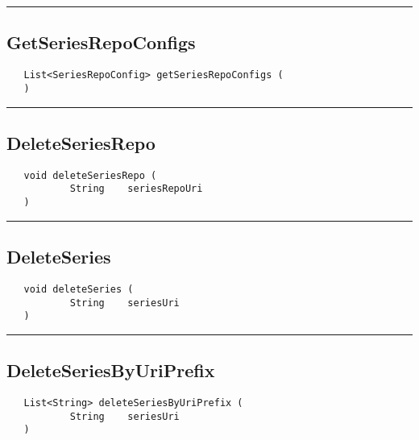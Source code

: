 \rule{15cm}{2pt}
\subsection{GetSeriesRepoConfigs}
\label{Api:GetSeriesRepoConfigs}
\begin{verbatim}
   List<SeriesRepoConfig> getSeriesRepoConfigs (
   )
\end{verbatim}



\rule{15cm}{2pt}
\subsection{DeleteSeriesRepo}
\label{Api:DeleteSeriesRepo}
\begin{verbatim}
   void deleteSeriesRepo (
           String    seriesRepoUri
   )
\end{verbatim}



\rule{15cm}{2pt}
\subsection{DeleteSeries}
\label{Api:DeleteSeries}
\begin{verbatim}
   void deleteSeries (
           String    seriesUri
   )
\end{verbatim}



\rule{15cm}{2pt}
\subsection{DeleteSeriesByUriPrefix}
\label{Api:DeleteSeriesByUriPrefix}
\begin{verbatim}
   List<String> deleteSeriesByUriPrefix (
           String    seriesUri
   )
\end{verbatim}



